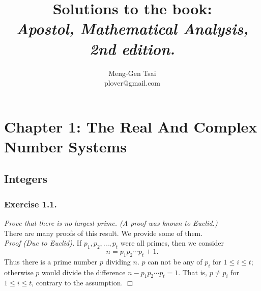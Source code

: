 \documentclass{article}
\title{\textbf{Solutions to the book: \\\emph{Apostol, Mathematical Analysis, 2nd edition.}}}
\author{Meng-Gen Tsai \\ plover@gmail.com}
\begin{document}
\maketitle
\tableofcontents












\newpage
\section*{Chapter 1: The Real And Complex Number Systems \\}



\subsection*{Integers \\}



\subsubsection*{Exercise 1.1.}
\emph{Prove that there is no largest prime. (A proof was known to Euclid.)} \\

There are many proofs of this result. We provide some of them. \\

\emph{Proof (Due to Euclid).}
If
$p_1, p_2, \ldots, p_t$ were all primes, then
we consider $$n = p_1 p_2 \cdots p_t + 1.$$
Thus there is a prime number $p$ dividing $n$.
$p$ can not be any of $p_i$ for $1 \leq i \leq t$;
otherwise $p$ would divide the difference $n - p_1 p_2 \cdots p_t = 1$.
That is, $p \neq p_i$ for $1 \leq i \leq t$,
contrary to the assumption.
$\Box$ \\
\end{document}
